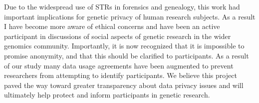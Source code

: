 Due to the widespread use of STRs in forensics and genealogy, this work had important implications for genetic privacy of human research subjects. As a result I have become more aware of ethical concerns and have been an active participant in discussions of social aspects of genetic research in the wider genomics community. Importantly, it is now recognized that it is impossible to promise anonymity, and that this should be clarified to participants. As a result of our study many data usage agreements have been augmented to prevent researchers from attempting to identify participants. We believe this project paved the way toward greater transparency about data privacy issues and will ultimately help protect and inform participants in genetic research.
